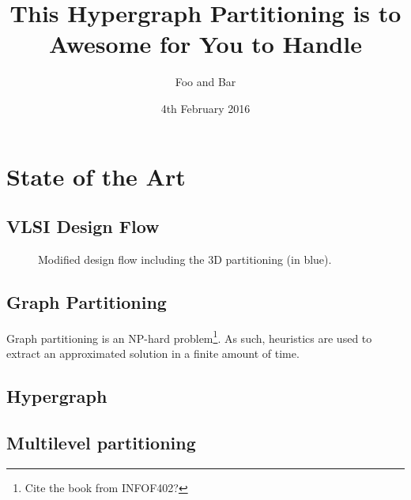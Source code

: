 \documentclass[twocolumn]{el-author}
\date{4th February 2016}
\begin{document}
\title{This Hypergraph Partitioning is to Awesome for You to Handle}

\author{Foo and Bar}


\maketitle

\section{State of the Art}

\subsection{VLSI Design Flow}
\begin{figure}[h]
\caption{Modified design flow including the 3D partitioning (in blue).}
\end{figure}

\subsection{Graph Partitioning}
Graph partitioning is an NP-hard problem\footnote{Cite the book from INFOF402?}.
As such, heuristics are used to extract an approximated solution in a finite amount of time.

\subsection{Hypergraph}

\subsection{Multilevel partitioning}
\end{document}
